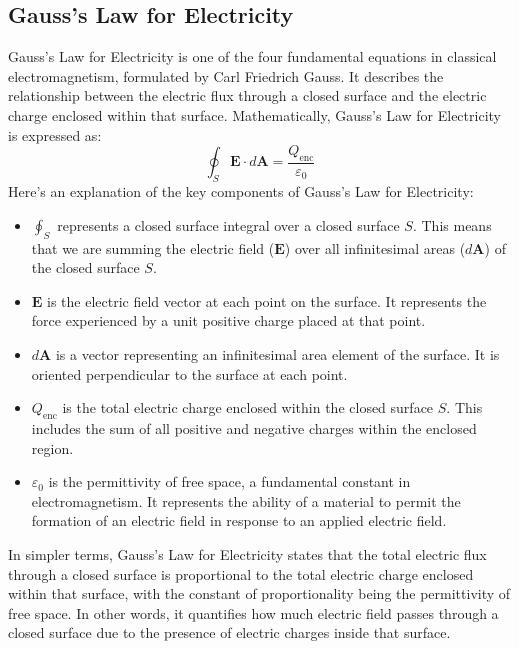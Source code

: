 \subsection{Gauss's Law for Electricity}
Gauss's Law for Electricity is one of the four fundamental equations in classical electromagnetism, formulated by Carl Friedrich Gauss.
It describes the relationship between the electric flux through a closed surface and the electric charge enclosed within that surface.
Mathematically, Gauss's Law for Electricity is expressed as:
\[
\oint_S \mathbf{E} \cdot d\mathbf{A} = \frac{Q_{\text{enc}}}{\varepsilon_0}
\]
Here's an explanation of the key components of Gauss's Law for Electricity:
\begin{itemize}
  \item $\oint_S$ represents a closed surface integral over a closed surface $S$. This means that we are summing the electric field ($\mathbf{E}$) over all infinitesimal areas ($d\mathbf{A}$) of the closed surface $S$.
  
  \item $\mathbf{E}$ is the electric field vector at each point on the surface. It represents the force experienced by a unit positive charge placed at that point.
  
  \item $d\mathbf{A}$ is a vector representing an infinitesimal area element of the surface. It is oriented perpendicular to the surface at each point.
  
  \item $Q_{\text{enc}}$ is the total electric charge enclosed within the closed surface $S$. This includes the sum of all positive and negative charges within the enclosed region.
  
  \item $\varepsilon_0$ is the permittivity of free space, a fundamental constant in electromagnetism. It represents the ability of a material to permit the formation of an electric field in response to an applied electric field.
\end{itemize}

In simpler terms, Gauss's Law for Electricity states that the total electric flux through a closed surface is proportional to the total electric charge enclosed within that surface, with the constant of proportionality being the permittivity of free space.
In other words, it quantifies how much electric field passes through a closed surface due to the presence of electric charges inside that surface.



